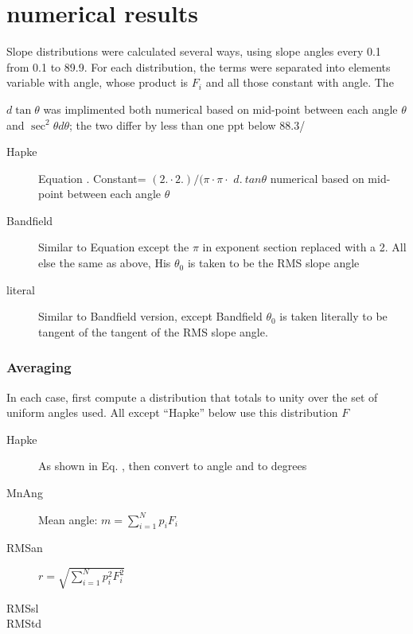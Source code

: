 \documentclass{article}
\begin{document}
\section{numerical results}
Slope distributions were calculated several ways, using slope angles every 0.1\qd~ from 0.1 to 89.9. For each distribution, the terms were separated into elements variable with angle, whose product is $F_i$ and all those constant with angle. The 


$d \tan \theta$ was implimented both numerical based on mid-point between each angle $\theta$  and $\sec^2 \theta d \theta$; the two differ by less than one ppt below 88.3\qd/

 \begin{description}  %
\item [Hapke]  Equation . Constant= $(2. \cdot  2.)/( \pi \cdot \pi \cdot$ $d. \ tan \theta$ numerical based on mid-point between each angle $\theta$ 
\item [Bandfield] Similar to Equation  except the $\pi$ in exponent
  section replaced with a 2. All else the same as above, His $\theta_0$ is taken
  to be the RMS slope angle
\item [literal]   Similar to Bandfield version, except Bandfield $\theta_0$ is taken literally to be tangent of the tangent of the RMS slope angle. 

\end{description}

\subsubsection{Averaging}
 In each case, first compute a distribution that totals to unity over the set of uniform angles used. All except ``Hapke'' below use this distribution $F$
 
\begin{description}  %
\item [Hapke]  As shown in Eq. , then convert to angle and to degrees
\item [MnAng]  Mean angle: $ m=\sum_{i=1}^N p_i F_i $
\item [RMSan]  $ r=\sqrt{ \sum_{i=1}^N p^2_i F^2_i }$
\item [RMSsl] 
\item [RMStd] 
\end{description}
\end{document}
